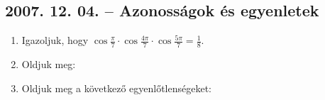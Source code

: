 \subsection*{2007. 12. 04. -- Azonosságok és egyenletek}
\begin{enumerate}
\item Igazoljuk, hogy $\cos\displaystyle{\frac{\pi}{7}}\cdot\cos\displaystyle{\frac{4\pi}{7}}\cdot\cos\displaystyle{\frac{5\pi}{7}}=\displaystyle{\frac{1}{8}}$.
\item Oldjuk meg:
\item Oldjuk meg a következő egyenlőtlenségeket:
\end{enumerate}

